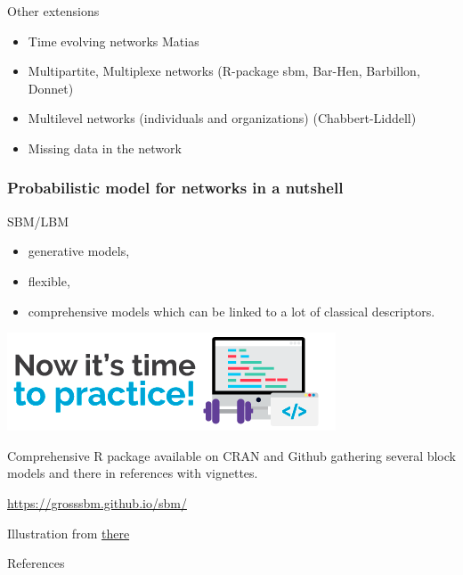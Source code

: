 \documentclass[compress,10pt]{beamer}
\begin{document}
\begin{frame}{Other extensions}

\begin{itemize}
\item  Time evolving networks \textcolor{mygreen}{Matias} 
\item  Multipartite, Multiplexe networks (\textcolor{mygreen}{R-package  sbm, Bar-Hen, Barbillon, Donnet}) 
\item Multilevel networks (individuals and organizations)  (\textcolor{mygreen}{Chabbert-Liddell})
 \item Missing data in the network \textcolor{mygreen}{\cite{tabouy2019variational}}
\end{itemize}
\end{frame}


\begin{frame}
 \frametitle{Probabilistic model for networks in a nutshell} 

 SBM/LBM
 \begin{itemize}
  \item generative models,
  \item flexible,
  \item comprehensive models which can be linked to a lot of classical descriptors.
  
 \end{itemize}
\end{frame}

\begin{frame}
\begin{center}
\includegraphics[width=0.5 \textwidth]{plots/PRACTICE-TIME}
\end{center}
  



Comprehensive R package available on CRAN and Github gathering several block models and there in references with vignettes.  

\href{https://grosssbm.github.io/sbm/}{\textcolor{dgreen}{https://grosssbm.github.io/sbm/}}



\vspace{5em}
{ \footnotesize Illustration from \href{http://androiddeveloper.galileo.edu/android-tutorial/time-to-practice-java-for-android-development/}{there}}


\end{frame}




\begin{frame}[allowframebreaks]{References}

 \small{}
  \end{frame}
  
  
  
\end{document}
